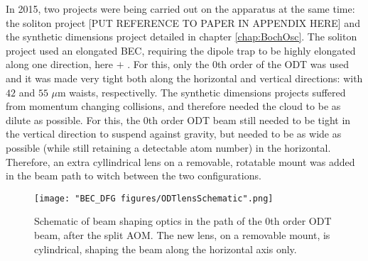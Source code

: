 In 2015, two projects were being carried out on the apparatus at the same time: the soliton project [PUT REFERENCE TO PAPER IN APPENDIX HERE]\cite{Aycock2017} and the synthetic dimensions project detailed in chapter \ref{chap:BochOsc}. The soliton project used an elongated BEC, requiring the dipole trap to be highly elongated along one direction, here \ex{} $+$ \ey{}. For this, only the 0th order of the ODT was used and it was made very tight both along the horizontal and vertical directions: with $42$ and $55$ $\mu$m waists, respectivelly. The synthetic dimensions projects suffered from momentum changing collisions, and therefore needed the cloud to be as dilute as possible. For this, the 0th order ODT beam still needed to be tight in the vertical direction to suspend against gravity, but needed to be as wide as possible (while still retaining a detectable atom number) in the horizontal. Therefore, an extra cyllindrical lens on a removable, rotatable mount was added in the beam path to witch between the two configurations. 


%

\begin{figure}
	\texttt{[image: "BEC\_DFG figures/ODTlensSchematic".png]}
\caption{Schematic of beam shaping optics in the path of the 0th order ODT beam, after the split AOM. The new lens, on a removable mount, is cylindrical, shaping the beam along the horizontal axis only. }
\label{fig:ODTlensSchematic}
\end{figure}

